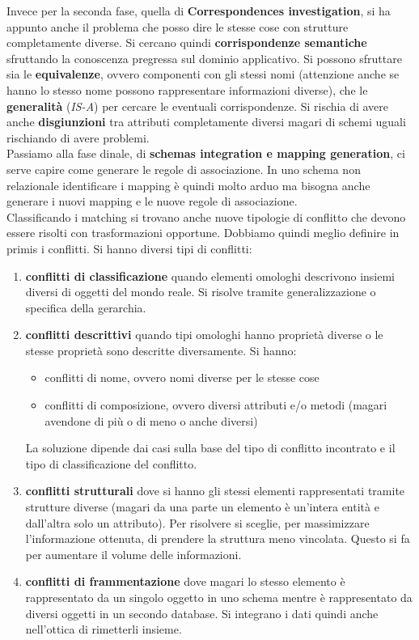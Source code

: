 Invece per la seconda fase, quella di \textbf{Correspondences investigation}, si ha appunto anche il problema che posso dire le stesse cose con strutture completamente diverse. Si cercano quindi \textbf{corrispondenze semantiche} sfruttando la conoscenza pregressa sul dominio applicativo. Si possono sfruttare sia le \textbf{equivalenze}, ovvero componenti con gli stessi nomi (attenzione anche se hanno lo stesso nome possono rappresentare informazioni diverse), che le \textbf{generalità} (\textit{IS-A}) per cercare le eventuali corrispondenze. Si rischia di avere anche \textbf{disgiunzioni} tra attributi completamente diversi magari di schemi uguali rischiando di avere problemi.\\ 

Passiamo alla fase dinale, di \textbf{schemas integration e mapping generation}, ci serve capire come generare le regole di associazione. In uno schema non relazionale identificare i mapping è quindi molto arduo ma bisogna anche generare i nuovi mapping e le nuove regole di associazione.\\ Classificando i matching si trovano anche nuove tipologie di conflitto che devono essere risolti con trasformazioni opportune. Dobbiamo quindi meglio definire in primis i conflitti.
Si hanno diversi tipi di conflitti:
\begin{enumerate}
    \item \textbf{conflitti di classificazione} quando elementi omologhi descrivono insiemi diversi di oggetti del mondo reale. Si risolve tramite generalizzazione o specifica della gerarchia.
    \item \textbf{conflitti descrittivi} quando tipi omologhi hanno proprietà diverse o le stesse proprietà sono descritte diversamente. Si hanno:
        \begin{itemize}
            \item conflitti di nome, ovvero nomi diverse per le stesse cose
            \item conflitti di composizione, ovvero diversi attributi e/o metodi (magari avendone di più o di meno o anche diversi)
        \end{itemize}
    La soluzione dipende dai casi sulla base del tipo di conflitto incontrato e il tipo di classificazione del conflitto. 
    \item \textbf{conflitti strutturali} dove si hanno gli stessi elementi rappresentati tramite strutture diverse (magari da una parte un elemento è un'intera entità e dall'altra solo un attributo). Per risolvere si sceglie, per massimizzare l'informazione ottenuta, di prendere la struttura meno vincolata. Questo si fa per aumentare il volume delle informazioni.  
    \item \textbf{conflitti di frammentazione} dove magari lo stesso elemento è rappresentato da un singolo oggetto in uno schema mentre è rappresentato da diversi oggetti in un secondo database. Si integrano i dati quindi anche nell'ottica di rimetterli insieme.
\end{enumerate}

